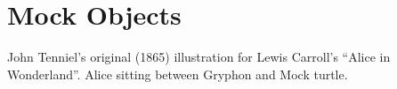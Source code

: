 \documentclass{beamer}
\begin{document}
\part{Mock Objects}
\begin{frame}
  \partpage
  \vspace*{.45\textheight}
  \begin{center}
    John Tenniel's original (1865) illustration for Lewis Carroll's ``Alice in Wonderland''. Alice sitting between Gryphon and Mock turtle.
  \end{center}
\end{frame}
\end{document}
